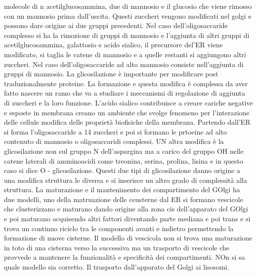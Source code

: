molecole di n acetilglucosammina, due di mannosio e il glucosio che viene rimosso con un mannosio prima dall'uscita. Questi zuccheri vengono modificati nel golgi e possono dare origine
ai due gruppi precedenti. Nel caso dell'oligosaccaride complesso si ha la rimozione di gruppi di mannosio e l'aggiunta di altri gruppi di acetilglucosammina, galattosio e acido sialico, 
il precursore del'ER viene modificato, si taglia le catene di mannosio e a quelle restanti si aggiungono altri zuccheri. Nel caso dell'oligosaccaride ad alto mannosio consiste 
nell'aggiunta di gruppi di mannosio. La glicosilazione \`e importante per modificare post traduzionalmente proteine. La formazione e questa modifica \`e complessa da aver fatto nascere
un ramo che va a studiare i meccanismi di regolazione di aggiunta di zuccheri e la loro funzione. L'acido sialico contribuisce a creare cariche negative e esposte in membrana creano un 
ambiente che svolge fenomeno per l'interazione delle cellule modifica delle propriet\`a biofisiche della membrana. Partendo dall'ER si forma l'oligosaccaride a 14 zuccheri e poi si 
formano le prtoeine ad alto contenuto di mannosio o oligosaccaridi complessi. UN altra modifica \`e la glicosilazione non sul gruppo N dell'aspargina ma a carico del gruppo OH nelle 
catene laterali di amminoacidi come treonina, serina, prolina, lisina e in questo caso si dice O - glicosilazione. Questi due tipi di glicosilazione danno origine a una modifica struttura
le diversa e si inserisce un altro grado di complessit\`a alla struttura. La maturazione e il mantenimento dei compartimento del GOlgi ha due modelli, uno della matruazione delle 
ceusterne dal ER si formano vescicole che clusterizzano e maturano dando origine alla zona cis dell'apparato del GOlgi e poi maturano acquisendo altri fattori diventando parte mediana e 
poi trans e si trova un continuo riciclo tra le componenti avanti e indietro permettendo la formazione di nuove cisterne. Il modello di vescicola non si trova una maturazione in toto
di una cisterna verso la successiva ma un trasporto di vescicole che provvede a mantenere la funzionalit\`a e specificit\`a dei compartimenti. NOn si sa quale modello sia corretto. 
Il trasporto dall'apparato del Golgi ai lisosomi. 
